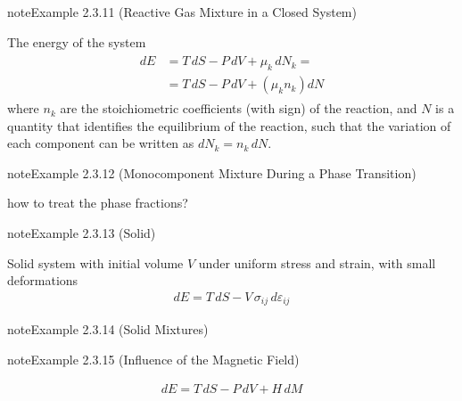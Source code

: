 \documentclass[letterpaper,10pt,english]{jupyterBook}
\begin{document}
\label{ch/principles-gibbs-phase-rule:example-14}
\begin{sphinxadmonition}{note}{Example 2.3.11 (Reactive Gas Mixture in a Closed System)}



\sphinxAtStartPar
The energy of the system
\begin{equation*}
\begin{split}
\begin{aligned}
  dE & = T \, dS - P \, dV + \mu_k \, dN_k = \\
     & = T \, dS - P \, dV + \left( \mu_k n_k \right) dN
\end{aligned}
\end{split}
\end{equation*}
\sphinxAtStartPar
where \( n_k \) are the stoichiometric coefficients (with sign) of the reaction, and \( N \) is a quantity that identifies the equilibrium of the reaction, such that the variation of each component can be written as \( dN_k = n_k \, dN \).
\end{sphinxadmonition}
\label{ch/principles-gibbs-phase-rule:example-15}
\begin{sphinxadmonition}{note}{Example 2.3.12 (Monocomponent Mixture During a Phase Transition)}



\sphinxAtStartPar
{} how to treat the phase fractions?
\end{sphinxadmonition}
\label{ch/principles-gibbs-phase-rule:example-16}
\begin{sphinxadmonition}{note}{Example 2.3.13 (Solid)}



\sphinxAtStartPar
Solid system with initial volume \( V \) under uniform stress and strain, with small deformations
\begin{equation*}
\begin{split}
dE = T \, dS - V \, \sigma_{ij} \, d \varepsilon_{ij}
\end{split}
\end{equation*}\end{sphinxadmonition}
\label{ch/principles-gibbs-phase-rule:example-17}
\begin{sphinxadmonition}{note}{Example 2.3.14 (Solid Mixtures)}



\sphinxAtStartPar
{}
\end{sphinxadmonition}
\label{ch/principles-gibbs-phase-rule:example-18}
\begin{sphinxadmonition}{note}{Example 2.3.15 (Influence of the Magnetic Field)}


\begin{equation*}
\begin{split}
dE = T \, dS - P \, d V + H \, dM
\end{split}
\end{equation*}
\sphinxAtStartPar
{}
\end{sphinxadmonition}
\end{document}
